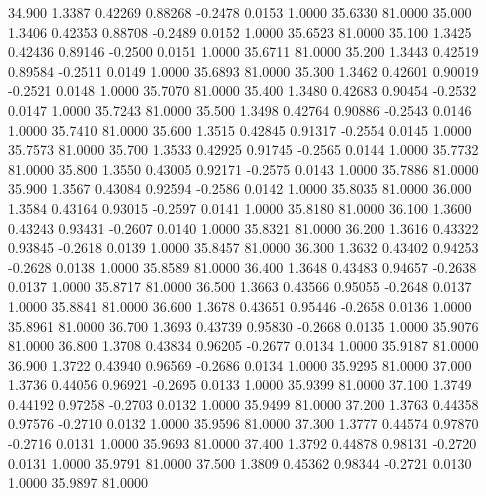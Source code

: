   34.900   1.3387   0.42269   0.88268  -0.2478   0.0153   1.0000  35.6330  81.0000
  35.000   1.3406   0.42353   0.88708  -0.2489   0.0152   1.0000  35.6523  81.0000
  35.100   1.3425   0.42436   0.89146  -0.2500   0.0151   1.0000  35.6711  81.0000
  35.200   1.3443   0.42519   0.89584  -0.2511   0.0149   1.0000  35.6893  81.0000
  35.300   1.3462   0.42601   0.90019  -0.2521   0.0148   1.0000  35.7070  81.0000
  35.400   1.3480   0.42683   0.90454  -0.2532   0.0147   1.0000  35.7243  81.0000
  35.500   1.3498   0.42764   0.90886  -0.2543   0.0146   1.0000  35.7410  81.0000
  35.600   1.3515   0.42845   0.91317  -0.2554   0.0145   1.0000  35.7573  81.0000
  35.700   1.3533   0.42925   0.91745  -0.2565   0.0144   1.0000  35.7732  81.0000
  35.800   1.3550   0.43005   0.92171  -0.2575   0.0143   1.0000  35.7886  81.0000
  35.900   1.3567   0.43084   0.92594  -0.2586   0.0142   1.0000  35.8035  81.0000
  36.000   1.3584   0.43164   0.93015  -0.2597   0.0141   1.0000  35.8180  81.0000
  36.100   1.3600   0.43243   0.93431  -0.2607   0.0140   1.0000  35.8321  81.0000
  36.200   1.3616   0.43322   0.93845  -0.2618   0.0139   1.0000  35.8457  81.0000
  36.300   1.3632   0.43402   0.94253  -0.2628   0.0138   1.0000  35.8589  81.0000
  36.400   1.3648   0.43483   0.94657  -0.2638   0.0137   1.0000  35.8717  81.0000
  36.500   1.3663   0.43566   0.95055  -0.2648   0.0137   1.0000  35.8841  81.0000
  36.600   1.3678   0.43651   0.95446  -0.2658   0.0136   1.0000  35.8961  81.0000
  36.700   1.3693   0.43739   0.95830  -0.2668   0.0135   1.0000  35.9076  81.0000
  36.800   1.3708   0.43834   0.96205  -0.2677   0.0134   1.0000  35.9187  81.0000
  36.900   1.3722   0.43940   0.96569  -0.2686   0.0134   1.0000  35.9295  81.0000
  37.000   1.3736   0.44056   0.96921  -0.2695   0.0133   1.0000  35.9399  81.0000
  37.100   1.3749   0.44192   0.97258  -0.2703   0.0132   1.0000  35.9499  81.0000
  37.200   1.3763   0.44358   0.97576  -0.2710   0.0132   1.0000  35.9596  81.0000
  37.300   1.3777   0.44574   0.97870  -0.2716   0.0131   1.0000  35.9693  81.0000
  37.400   1.3792   0.44878   0.98131  -0.2720   0.0131   1.0000  35.9791  81.0000
  37.500   1.3809   0.45362   0.98344  -0.2721   0.0130   1.0000  35.9897  81.0000
